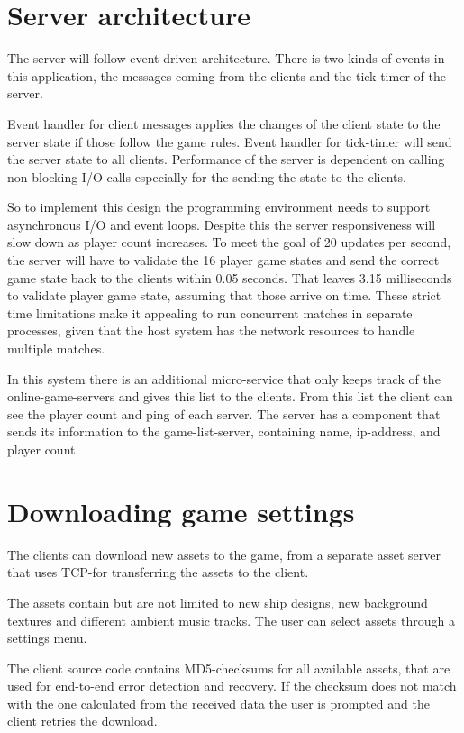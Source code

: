 \documentclass[10pt,a4paper]{article}
\begin{document}
\section{Server architecture}

The server will follow event driven architecture. There is two kinds of events
in this application, the messages coming from the clients and the tick-timer of the server.

Event handler for client messages applies the changes of the client state to the
server state if those follow the game rules. 
Event handler for tick-timer will send the server state to all clients.  
Performance of the server is dependent on calling non-blocking I/O-calls especially
for the sending the state to the clients.

So to implement this design the programming environment needs to support
asynchronous I/O and event loops. Despite this the server responsiveness will
slow down as player count increases. To meet the goal of 20 updates per second,
the server will have to validate the 16 player game states and send the correct
game state back to the clients within 0.05 seconds. That leaves 3.15
milliseconds to validate player game state, assuming that those arrive on time.
These strict time limitations make it appealing to run concurrent matches in
separate processes, given that the host system has the network resources to
handle multiple matches.

In this system there is an additional micro-service that only keeps track
of the online-game-servers and gives this list to the clients. From this 
list the client can see the player count and ping of each server.
The server has a component that sends its information to the game-list-server,
containing name, ip-address, and player count.

\section{Downloading game settings}

The clients can download new assets to the game, from a separate asset server
that uses TCP-for transferring the assets to the client.

The assets contain but are not limited to new ship designs, new background textures and
different ambient music tracks. The user can select assets through a settings menu.

The client source code
contains MD5-checksums for all available assets, that are used for end-to-end
error detection and recovery. If the checksum does not match with the one calculated
from the received data the user is prompted and the client retries the download.

\newpage




 
 
\end{document}
